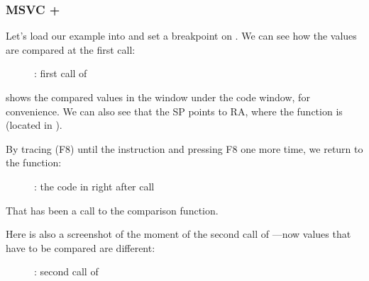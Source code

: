 ﻿\clearpage
\subsubsection{MSVC + \olly}
\myindex{\olly}

Let's load our example into \olly and set a breakpoint on \comp.
We can see how the values are compared at the first \comp call:

\begin{figure}[H]
\centering
{}
\caption{\olly: first call of \comp}
\label{fig:qsort_olly1}
\end{figure}

\olly shows the compared values in the window under the code window, for convenience.
We can also see that the \ac{SP} points to \ac{RA}, where the \qsort function is (located in ).

\clearpage
By tracing (F8) until the  instruction and pressing F8 one more time, we return to the \qsort function:

\begin{figure}[H]
\centering
{}
\caption{\olly: the code in \qsort right after \comp call}
\label{fig:qsort_olly2}
\end{figure}

That has been a call to the comparison function.

\clearpage
Here is also a screenshot of the moment of the second call of \comp{}---now values that have to be compared are different:

\begin{figure}[H]
\centering
{}
\caption{\olly: second call of \comp}
\label{fig:qsort_olly3}
\end{figure}

